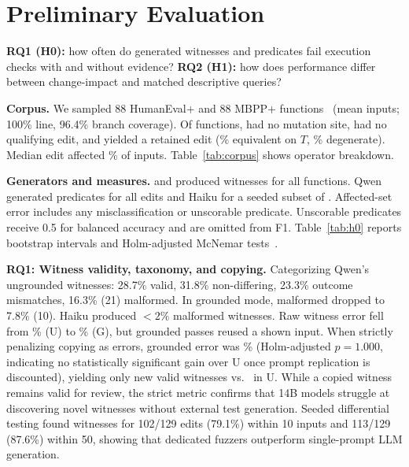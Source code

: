 \section{Preliminary Evaluation}\label{sec:eval}
\textbf{RQ1 (H0):} how often do generated witnesses and predicates fail execution checks with and without evidence?
\textbf{RQ2 (H1):} how does performance differ between change-impact and matched descriptive queries?

\textbf{Corpus.} We sampled 88 HumanEval+ and 88 MBPP+ functions~\cite{chen2021humaneval,austin2021mbpp,liu2023evalplus} (mean \SMeanInputsPerFunction{} inputs; 100\% line, 96.4\% branch coverage). Of \SNFunctionsAttempted{} functions, \SNNoCandidates{} had no mutation site, \SNNoNonequivalent{} had no qualifying edit, and \SNMutants{} yielded a retained edit (\PEquivalentCandidateRate\% equivalent on $T$, \SNDegenerate\% degenerate). Median edit affected \PzMedianDifferingFraction\% of inputs. Table~\ref{tab:corpus} shows operator breakdown.


\textbf{Generators and measures.} \GenModel{} and \StrongModel{} produced witnesses for all \SNMutants{} functions. Qwen generated predicates for all edits and Haiku for a seeded subset of \SPredStrongN{}. Affected-set error includes any misclassification or unscorable predicate. Unscorable predicates receive 0.5 for balanced accuracy and are omitted from F1. Table~\ref{tab:h0} reports bootstrap intervals and Holm-adjusted McNemar tests~\cite{mcnemar1947note}.


\textbf{RQ1: Witness validity, taxonomy, and copying.}
Categorizing Qwen's \SNMutants{} ungrounded witnesses: 28.7\% valid, 31.8\% non-differing, 23.3\% outcome mismatches, 16.3\% (21) malformed. In grounded mode, malformed dropped to 7.8\% (10). Haiku produced $<2\%$ malformed witnesses.
Raw witness error fell from \PWitGenRawA\% (U) to \PWitGenRawB\% (G), but \SWitGenCopiedPass{} grounded passes reused a shown input. When strictly penalizing copying as errors, grounded error was \PWitGenStrictB\% (Holm-adjusted $p=1.000$, indicating no statistically significant gain over U once prompt replication is discounted), yielding only \SWitGenOwnValidG{} new valid witnesses vs.\ \SWitGenOwnValidU{} in U. While a copied witness remains valid for review, the strict metric confirms that 14B models struggle at discovering novel witnesses without external test generation.
Seeded differential testing found witnesses for 102/129 edits (79.1\%) within 10 inputs and 113/129 (87.6\%) within 50, showing that dedicated fuzzers outperform single-prompt LLM generation.

